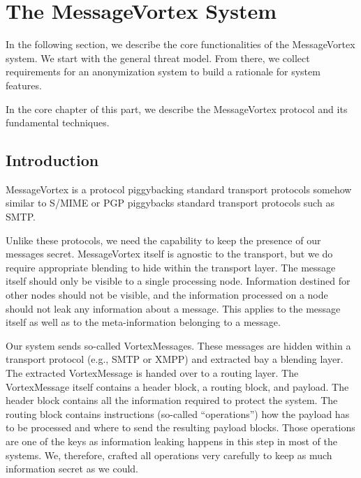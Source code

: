 

\part{The  MessageVortex System}

In the following section, we describe the core functionalities of the MessageVortex system. We start with the general threat model. From there, we collect requirements for an anonymization system to build a rationale for system features.

In the core chapter of this part, we describe the MessageVortex protocol and its fundamental techniques.

\chapter{Introduction}
MessageVortex is a protocol piggybacking standard transport protocols somehow similar to S/MIME\cite{RFC2015} or PGP\cite{PGP} piggybacks standard transport protocols such as SMTP. 

Unlike these protocols, we need the capability to keep the presence of our messages secret. MessageVortex itself is agnostic to the transport, but we do require appropriate blending to hide within the transport layer. The message itself should only be visible to a single processing node. Information destined for other nodes should not be visible, and the information processed on a node should not leak any information about a message. This applies to the message itself as well as to the meta-information belonging to a message. 

Our system sends so-called VortexMessages. These messages are hidden within a transport protocol (e.g., SMTP or XMPP) and extracted bay a blending layer. The extracted VortexMessage is handed over to a routing layer. The VortexMessage itself contains a header block, a routing block, and payload. The header block contains all the information required to protect the system. The routing block contains instructions (so-called ``operations'') how the payload has to be processed and where to send the resulting payload blocks. Those operations are one of the keys as information leaking happens in this step in most of the systems. We, therefore, crafted all operations very carefully to keep as much information secret as we could.

